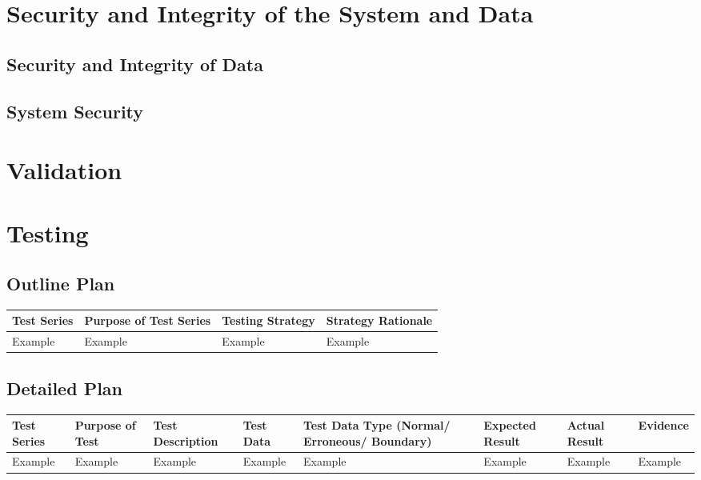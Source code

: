 \section{Security and Integrity of the System and Data}

\subsection{Security and Integrity of Data}

\subsection{System Security}

\section{Validation}

\section{Testing}

\begin{landscape}
\subsection{Outline Plan}

\begin{center}
    \begin{tabular}{|p{2cm}|p{5cm}|p{5cm}|p{4cm}|}
        \hline
        \textbf{Test Series} & \textbf{Purpose of Test Series} & \textbf{Testing Strategy} & \textbf{Strategy Rationale}\\ \hline
        Example & Example & Example & Example \\ \hline
    \end{tabular}
\end{center}

\subsection{Detailed Plan}

\begin{center}
    \begin{longtable}{|p{1.5cm}|p{2.5cm}|p{2.5cm}|p{2cm}|p{2cm}|p{2cm}|p{2cm}|p{2cm}|}
        \hline
        \textbf{Test Series} & \textbf{Purpose of Test} & \textbf{Test Description} & \textbf{Test Data} & \textbf{Test Data Type (Normal/ Erroneous/ Boundary)} & \textbf{Expected Result} & \textbf{Actual Result} & \textbf{Evidence}\\ \hline
        Example & Example & Example & Example & Example & Example & Example & Example \\ \hline
    \end{longtable}
\end{center}
\end{landscape}
